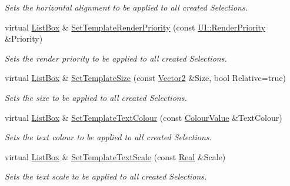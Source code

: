 \begin{DoxyCompactItemize}
\begin{DoxyCompactList}\small\item\em Sets the horizontal alignment to be applied to all created Selections. \item\end{DoxyCompactList}\item 
virtual \hyperlink{classMezzanine_1_1UI_1_1ListBox}{ListBox} \& \hyperlink{classMezzanine_1_1UI_1_1ListBox_ae4b5fd90298eaf10677011ecfaf7487c}{SetTemplateRenderPriority} (const \hyperlink{namespaceMezzanine_1_1UI_ac4c753eb6b5d66350a243acc9ce54130}{UI::RenderPriority} \&Priority)
\begin{DoxyCompactList}\small\item\em Sets the render priority to be applied to all created Selections. \item\end{DoxyCompactList}\item 
virtual \hyperlink{classMezzanine_1_1UI_1_1ListBox}{ListBox} \& \hyperlink{classMezzanine_1_1UI_1_1ListBox_af96485460545e5c77ae3b8640c274f0a}{SetTemplateSize} (const \hyperlink{classMezzanine_1_1Vector2}{Vector2} \&Size, bool Relative=true)
\begin{DoxyCompactList}\small\item\em Sets the size to be applied to all created Selections. \item\end{DoxyCompactList}\item 
virtual \hyperlink{classMezzanine_1_1UI_1_1ListBox}{ListBox} \& \hyperlink{classMezzanine_1_1UI_1_1ListBox_aa60c0565e8f114162d90de6ef646becf}{SetTemplateTextColour} (const \hyperlink{classMezzanine_1_1ColourValue}{ColourValue} \&TextColour)
\begin{DoxyCompactList}\small\item\em Sets the text colour to be applied to all created Selections. \item\end{DoxyCompactList}\item 
virtual \hyperlink{classMezzanine_1_1UI_1_1ListBox}{ListBox} \& \hyperlink{classMezzanine_1_1UI_1_1ListBox_a220465a3c68071ad7b168f98ac191cd3}{SetTemplateTextScale} (const \hyperlink{namespaceMezzanine_a726731b1a7df72bf3583e4a97282c6f6}{Real} \&Scale)
\begin{DoxyCompactList}\small\item\em Sets the text scale to be applied to all created Selections. \item\end{DoxyCompactList}\item 

\end{DoxyCompactItemize}
